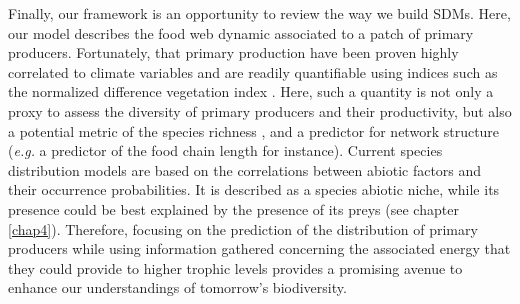 Finally, our framework is an opportunity to review the way we build
SDMs. Here, our model describes the food web dynamic associated to a
patch of primary producers. Fortunately, that primary production have
been proven highly correlated to climate variables
\citep{Wright1983, Hawkins2003, Evans2005} and are readily quantifiable
using indices such as the normalized difference vegetation index
\citep[NDVI,][]{Evans2005}. Here, such a quantity is not only a proxy to
assess the diversity of primary producers and their productivity, but
also a potential metric of the species richness \citep{Wright1983}, and
a predictor for network structure (\emph{e.g.} a predictor of the food
chain length for instance). Current species distribution models are
based on the correlations between abiotic factors and their occurrence
probabilities. It is described as a species abiotic niche, while its
presence could be best explained by the presence of its preys (see
chapter \ref{chap4}). Therefore, focusing on the prediction of the
distribution of primary producers while using information gathered
concerning the associated energy that they could provide to higher
trophic levels provides a promising avenue to enhance our understandings
of tomorrow's biodiversity.

